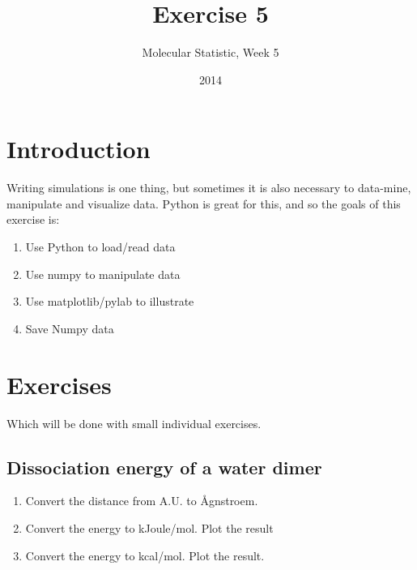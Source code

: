 \documentclass{article}
\title{Exercise 5}
\author{Molecular Statistic, Week 5}
\date{2014}
\begin{document}

\maketitle

\section{Introduction}

Writing simulations is one thing, but sometimes it is also necessary to data-mine, manipulate and visualize data.
Python is great for this, and so the goals of this exercise is:

\begin{enumerate}
    \item Use Python to load/read data

    \item Use numpy to manipulate data

    \item Use matplotlib/pylab to illustrate 

    \item Save Numpy data

\end{enumerate}

\newpage
\section{Exercises}

Which will be done with small individual exercises.

\subsection{Dissociation energy of a water dimer}


\begin{enumerate}

    \item Convert the distance from A.U. to \AA gnstroem.

    \item Convert the energy to kJoule/mol. Plot the result

    \item Convert the energy to kcal/mol. Plot the result.

\end{enumerate}




\end{document}

